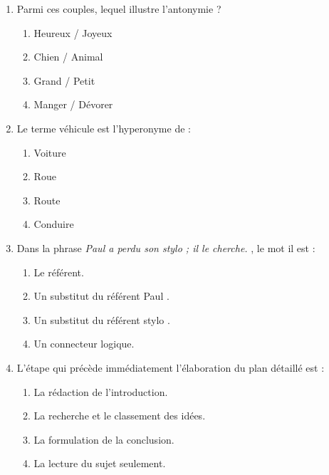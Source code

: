 \documentclass[11pt]{article}
\begin{document}
\begin{exercice}
\begin{enumerate}
    \item Parmi ces couples, lequel illustre l'antonymie ?
    \begin{enumerate}
        \item \og Heureux / Joyeux \fg{}
        \item \og Chien / Animal \fg{}
        \item \og Grand / Petit \fg{}
        \item \og Manger / Dévorer \fg{}
    \end{enumerate}
    \item Le terme \og véhicule \fg{} est l'hyperonyme de :
    \begin{enumerate}
        \item \og Voiture \fg{}
        \item \og Roue \fg{}
        \item \og Route \fg{}
        \item \og Conduire \fg{}
    \end{enumerate}
    \item Dans la phrase \og \textit{Paul a perdu son stylo ; il le cherche.} \fg{}, le mot \og il \fg{} est :
    \begin{enumerate}
        \item Le référent.
        \item Un substitut du référent \og Paul \fg{}.
        \item Un substitut du référent \og stylo \fg{}.
        \item Un connecteur logique.
    \end{enumerate}
    \item L'étape qui précède immédiatement l'élaboration du plan détaillé est :
    \begin{enumerate}
        \item La rédaction de l'introduction.
        \item La recherche et le classement des idées.
        \item La formulation de la conclusion.
        \item La lecture du sujet seulement.
    \end{enumerate}
\end{enumerate}
\end{exercice}
\end{document}
